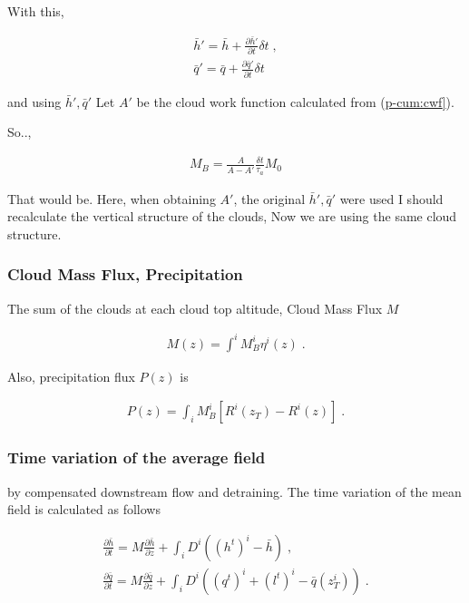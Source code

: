 With this,

\begin{eqnarray}
  \bar{h}'  =  \bar{h} + \frac{\partial \bar{h}'}{\partial t} \delta t \; , \\
  \bar{q}'  =  \bar{q} + \frac{\partial \bar{q}'}{\partial t} \delta t 
\end{eqnarray}

and using \(\bar{h}', \bar{q}'\) Let \(A'\) be the cloud work function
calculated from (\protect\hyperlink{p-cum:cwf}{p-cum:cwf{]}}).

So..,

\begin{eqnarray}
  M_B = \frac{A}{A-A'} \frac{\delta t}{\tau_a} M_0 
\end{eqnarray}

That would be. Here, when obtaining \(A'\), the original
\(\bar{h}', \bar{q}'\) were used I should recalculate the vertical
structure of the clouds, Now we are using the same cloud structure.

\hypertarget{cloud-mass-flux-precipitation}{%
\subsubsection{Cloud Mass Flux,
Precipitation}\label{cloud-mass-flux-precipitation}}

The sum of the clouds at each cloud top altitude, Cloud Mass Flux \(M\)

\begin{eqnarray}
  M(z)   = \int^i M_B^i \eta^i(z) \; .
\end{eqnarray}

Also, precipitation flux \(P(z)\) is

\begin{eqnarray}
 P(z) = \int_i M_B^i \left[ R^i(z_T)-R^i(z) \right]  \; .
\end{eqnarray}

\hypertarget{time-variation-of-the-average-field}{%
\subsubsection{Time variation of the average
field}\label{time-variation-of-the-average-field}}

by compensated downstream flow and detraining. The time variation of the
mean field is calculated as follows

\begin{eqnarray}
  \frac{\partial \bar{h}}{\partial t}  =  M \frac{\partial \bar{h}}{\partial z} 
                    + \int_i D^i ( (h^t)^i - \bar{h} ) \; , \\
  \frac{\partial \bar{q}}{\partial t}  =  M\frac{\partial \bar{q}}{\partial z} 
                    + \int_i D^i ( (q^t)^i + (l^t)^i - \bar{q}(z_T^i) ) \; .
\end{eqnarray}

